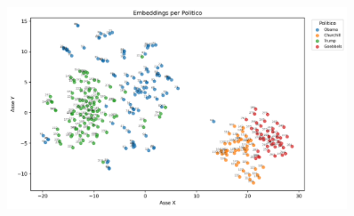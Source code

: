 \documentclass{article}
\begin{document}
	\begin{figure}[H]
		\centering
		\includegraphics[width=0.9\textwidth]{immagini/word_embedding}
	\end{figure}
	\newpage	
\end{document}
